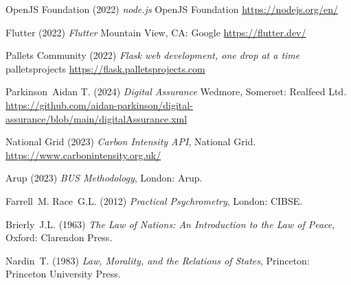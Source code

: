 \documentclass[11pt, oneside]{book}   	%
\begin{document}
\begin{thebibliography}{99}
 OpenJS Foundation (2022)
\emph{node.js}
OpenJS Foundation
\url{https://nodejs.org/en/}

 Flutter (2022)
\emph{Flutter}
Mountain View, CA: Google 
\url{https://flutter.dev/}

 Pallets Community (2022)
\emph{Flask web development, one drop at a time}
palletsprojects
\url{https://flask.palletsprojects.com}

 Parkinson~Aidan T. (2024)
\emph{Digital Assurance}
Wedmore, Somerset: Realfeed Ltd.
\url{https://github.com/aidan-parkinson/digital-assurance/blob/main/digitalAssurance.xml}

 National Grid (2023)
\emph{Carbon Intensity API},
National Grid.
\url{https://www.carbonintensity.org.uk/}

 Arup (2023)
\emph{BUS Methodology},
London: Arup.

 Farrell~M. Race~G.L. (2012)
\emph{Practical Psychrometry},
London: CIBSE.

 Brierly~J.L. (1963)
\emph{The Law of Nations: An Introduction to the Law of Peace},
Oxford: Clarendon Press.

 Nardin~T. (1983)
\emph{Law, Morality, and the Relations of States},
Princeton: Princeton University Press.

\end{thebibliography}

\newpage
\thispagestyle{empty}
\mbox{}
\newpage

\newpage
\thispagestyle{empty}
\mbox{}
\newpage
\end{document}
